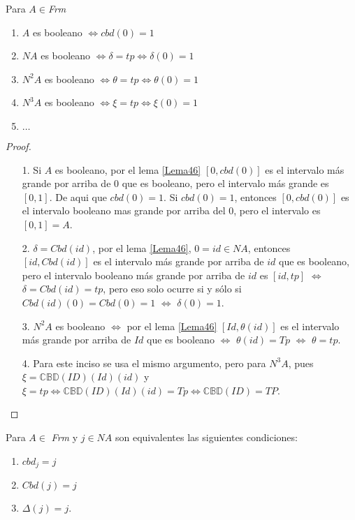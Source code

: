 \begin{theorem}
Para $A\in$\textit{Frm}
\begin{enumerate}
\item $A$ es booleano $\Leftrightarrow cbd(0)=1$
\item $NA$ es booleano $\Leftrightarrow \delta=tp\Leftrightarrow\delta(0)=1$
\item $N^2A$ es booleano $\Leftrightarrow \theta=tp\Leftrightarrow\theta(0)=1$
\item $N^3A$ es booleano $\Leftrightarrow \xi=tp\Leftrightarrow\xi(0)=1$
\item $\ldots$
\end{enumerate}
\end{theorem}

\begin{proof}
\begin{itemize}
\item[1.] Si $A$ es booleano, por el lema \ref{Lema46} $[0,cbd(0)]$ es el intervalo más grande por arriba de 0 que es booleano, pero el intervalo más grande es $[0,1]$. De aqui que $cbd(0)=1$. Si $cbd(0)=1$, entonces  $[0,cbd(0)]$ es el intervalo booleano mas grande por arriba del 0, pero el intervalo es $[0,1]=A$.
\item[2.] $\delta=Cbd(id)$, por el lema \ref{Lema46}, $0=id\in NA$, entonces $[id, Cbd(id)]$ es el intervalo más grande por arriba de $id$ que es booleano, pero el intervalo booleano más grande por arriba de $id$ es $[id, tp]$ $\Leftrightarrow$ $\delta=Cbd(id)=tp$, pero eso solo ocurre si y sólo si $Cbd(id)(0)=Cbd(0)=1$ $\Leftrightarrow$ $\delta(0)=1.$
\item[3.] $N^2A$ es booleano $\Leftrightarrow$ por el lema \ref{Lema46} $[Id, \theta(id)]$ es el intervalo más grande por arriba de $Id$ que es booleano $\Leftrightarrow$ $\theta(id)=Tp$ $\Leftrightarrow$ $\theta=tp$.
\item[4.] Para este inciso se usa el mismo argumento, pero para $N^3A$, pues $\xi=\mathbb{CBD}(ID)(Id)(id)$ y $\xi=tp\Leftrightarrow \mathbb{CBD}(ID)(Id)(id)=Tp\Leftrightarrow \mathbb{CBD}(ID)=TP$.
\end{itemize}
\end{proof}

\begin{theorem}
Para $A\in$ \textit{Frm} y $j\in NA$ son equivalentes las siguientes condiciones:
\begin{enumerate}
\item $cbd_j=j$
\item $Cbd(j)=j$
\item $\Delta(j)=j$.
\end{enumerate}
\end{theorem}

